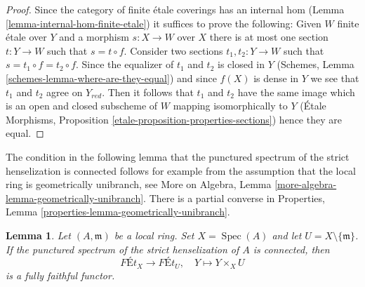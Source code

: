 \documentclass{stacks-project}
\theoremstyle{plain}
\newtheorem{lemma}[subsection]{Lemma}
\theoremstyle{definition}
\theoremstyle{remark}
\numberwithin{equation}{subsection}
\def\Spec{\mathop{\mathrm{Spec}}}
\begin{document}
\begin{proof}
Since the category of finite \'etale coverings has an
internal hom (Lemma \ref{lemma-internal-hom-finite-etale})
it suffices to prove the following: Given $W$ finite \'etale over $Y$
and a morphism $s : X \to W$ over $X$ there is at most one section
$t : Y \to W$ such that $s = t \circ f$. Consider two sections
$t_1, t_2 : Y \to W$ such that $s = t_1 \circ f = t_2 \circ f$.
Since the equalizer of $t_1$ and $t_2$ is closed in $Y$
(Schemes, Lemma \ref{schemes-lemma-where-are-they-equal})
and since $f(X)$ is dense in $Y$ we see that $t_1$ and $t_2$
agree on $Y_{red}$. Then it follows that $t_1$ and $t_2$ have
the same image which is an open and closed subscheme of $W$ mapping
isomorphically to $Y$
(\'Etale Morphisms, Proposition \ref{etale-proposition-properties-sections})
hence they are equal.
\end{proof}

\noindent
The condition in the following lemma that the punctured spectrum
of the strict henselization is connected follows for example from
the assumption that the local ring is geometrically unibranch, see
More on Algebra, Lemma \ref{more-algebra-lemma-geometrically-unibranch}.
There is a partial converse in
Properties, Lemma \ref{properties-lemma-geometrically-unibranch}.

\begin{lemma}
\label{lemma-same-etale-extensions}
Let $(A, \mathfrak m)$ be a local ring. Set $X = \Spec(A)$
and let $U = X \setminus \{\mathfrak m\}$. If the punctured spectrum
of the strict henselization of $A$ is connected, then
$$
\textit{F\'Et}_X \longrightarrow \textit{F\'Et}_U,\quad
Y \longmapsto Y \times_X U
$$
is a fully faithful functor.
\end{lemma}
\end{document}

